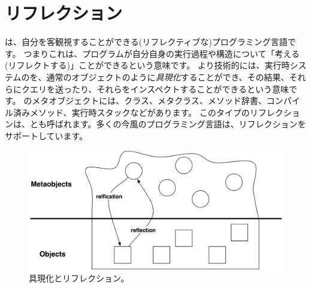 \documentclass[a4paper,10pt,twoside]{book}
\begin{document}
	\renewcommand{\nnbb}[2]{} %
	\sloppy
\fi

\chapter{リフレクション}


\st{}は、自分を客観視することができる(リフレクティブな)プログラミング言語です。
つまりこれは、プログラムが自分自身の実行過程や構造について「考える(リフレクトする)」ことができるという意味です。
より技術的には、実行時システムのを、通常のオブジェクトのように\emph{具現化}することができ、その結果、それらにクエリを送ったり、それらをインスペクトすることができるという意味です。
\st{}のメタオブジェクトには、クラス、メタクラス、メソッド辞書、コンパイル済みメソッド、実行時スタックなどがあります。
このタイプのリフレクションは、とも呼ばれます。多くの今風のプログラミング言語は、リフレクションをサポートしています。

\begin{figure}[ht]\centering
	\includegraphics[width=\linewidth]{reflect}
	\caption{具現化とリフレクション。} %
\end{figure}
\end{document}
